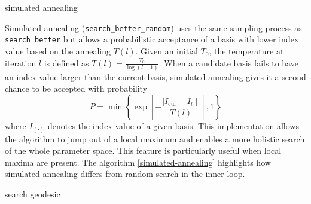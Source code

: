 \begin{algorithm}
\SetAlgoLined
{}
  \caption{simulated annealing}
  \label{simulated-annealing}
\end{algorithm}

Simulated annealing (\texttt{search\_better\_random})
\citep{kirkpatrick1983optimization, bertsimas1993simulated} uses the
same sampling process as \texttt{search\_better} but allows a
probabilistic acceptance of a basis with lower index value based on the
annealing \(T(l)\). Given an initial \(T_0\), the temperature at
iteration \(l\) is defined as \(T(l) = \frac{T_0}{\log(l + 1)}\). When a
candidate basis fails to have an index value larger than the current
basis, simulated annealing gives it a second chance to be accepted with
probability
\[P= \min\left\{\exp\left[-\frac{\mid I_{\text{cur}} - I_{l} \mid}{T(l)}\right],1\right\}\]
where \(I_{(\cdot)}\) denotes the index value of a given basis. This
implementation allows the algorithm to jump out of a local maximum and
enables a more holistic search of the whole parameter space. This
feature is particularly useful when local maxima are present. The
algorithm \ref{simulated-annealing} highlights how simulated annealing
differs from random search in the inner loop.

\begin{algorithm}
\SetAlgoLined
{}
\caption{search geodesic}
\label{search-geodesic}
\end{algorithm}


